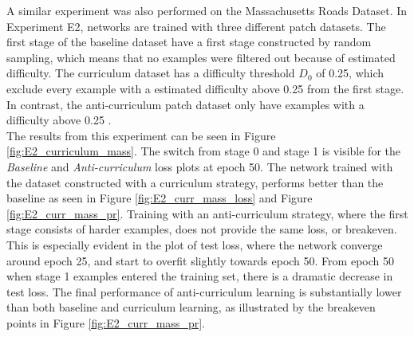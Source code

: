 

A similar experiment was also performed on the Massachusetts Roads Dataset. In Experiment E2, networks are trained with three different patch datasets. The first stage of the baseline dataset have a first stage constructed by random sampling, which means that no examples were filtered out because of estimated difficulty. The curriculum dataset has a difficulty threshold $D_0$ of 0.25, which exclude every example with a estimated difficulty above 0.25 from the first stage. In contrast, the anti-curriculum patch dataset only have examples with a difficulty above 0.25 .\\


The results from this experiment can be seen in Figure \ref{fig:E2_curriculum_mass}. The switch from stage 0 and stage 1 is visible for the \textit{Baseline} and \textit{Anti-curriculum} loss plots at epoch 50. The network trained with the dataset constructed with a curriculum strategy, performs better than the baseline as seen in Figure \ref{fig:E2_curr_mass_loss} and Figure \ref{fig:E2_curr_mass_pr}. Training with an anti-curriculum strategy, where the first stage consists of harder examples, does not provide the same loss, or breakeven. This is especially evident in the plot of test loss, where the network converge around epoch 25, and start to overfit slightly towards epoch 50. From epoch 50 when stage 1 examples entered the training set, there is a dramatic decrease in test loss. The final performance of anti-curriculum learning is substantially lower than both baseline and curriculum learning, as illustrated by the breakeven points in Figure \ref{fig:E2_curr_mass_pr}.\\

